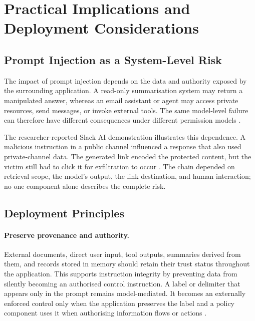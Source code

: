 \section{Practical Implications and Deployment Considerations}
\label{sec:praxis}

\subsection{Prompt Injection as a System-Level Risk}

The impact of prompt injection depends on the data and authority exposed by the
surrounding application. A read-only summarisation system may return a
manipulated answer, whereas an email assistant or agent may access private
resources, send messages, or invoke external tools. The same model-level failure
can therefore have different consequences under different permission models
\parencite{debenedetti2024agentdojo}.

The researcher-reported Slack AI demonstration illustrates this dependence. A
malicious instruction in a public channel influenced a response that also used
private-channel data. The generated link encoded the protected content, but the
victim still had to click it for exfiltration to occur
\parencite{promptarmor2024slack}. The chain depended on retrieval scope, the
model's output, the link destination, and human interaction; no one component
alone describes the complete risk.

\subsection{Deployment Principles}

\paragraph{Preserve provenance and authority.}

External documents, direct user input, tool outputs, summaries derived from
them, and records stored in memory should retain their trust status throughout
the application. This supports instruction integrity by preventing data from
silently becoming an authorised control instruction. A label or delimiter that
appears only in the prompt remains model-mediated. It becomes an externally
enforced control only when the application preserves the label and a policy
component uses it when authorising information flows or actions
\parencites{hines2024spotlighting}{wu2024systemlevel}.

